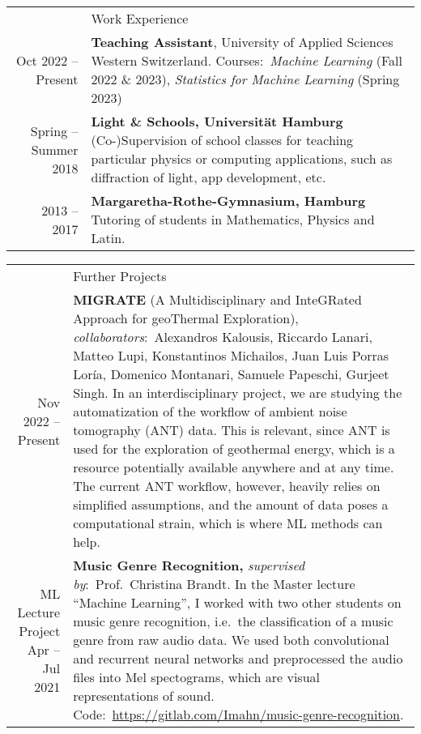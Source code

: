 \documentclass[11pt, a4paper]{article}
\newcommand{\headingfont}{\Large\color{OliveGreen}}
\newenvironment{SectionTable}[1]{
	\renewcommand*{\arraystretch}{1.7}
	\setlength{\tabcolsep}{10pt}
	\begin{longtable}{Rp{5.2in}} & #1 \\}
	{\end{longtable}\vspace{-.3cm}}
\begin{document}
	\newpage 

	\begin{SectionTable}{\headingfont Work Experience}
		Oct 2022 -- Present & \textbf{Teaching Assistant}, University of Applied Sciences Western Switzerland. \newline Courses:~\textit{Machine Learning} (Fall 2022 \& 2023), \textit{Statistics for Machine Learning} (Spring 2023) \\
		
		Spring -- Summer 2018 & 
		\textbf{Light \& Schools, Universität Hamburg} \newline
		(Co-)Supervision of school classes for teaching particular physics or computing applications, such as diffraction of light, app development, etc.\\ 
		
		2013 -- 2017 & \textbf{Margaretha-Rothe-Gymnasium, Hamburg} \newline 
		Tutoring of students in Mathematics, Physics and Latin. 
	\end{SectionTable}

	\begin{SectionTable}{\headingfont Further Projects}
		Nov 2022 -- Present & \textbf{MIGRATE} (A Multidisciplinary and InteGRated Approach for geoThermal Exploration), \textit{collaborators}:~Alexandros Kalousis, Riccardo Lanari, Matteo Lupi, Konstantinos Michailos,
        Juan Luis Porras Loría, Domenico Montanari, Samuele Papeschi, Gurjeet Singh. In an interdisciplinary project, we are studying the automatization of the workflow of ambient noise tomography (ANT) data. 
        This is relevant, since ANT is used for the exploration of geothermal energy, which is a resource potentially available anywhere and at any time. The current ANT workflow, however, heavily relies on 
        simplified assumptions, and the amount of data poses a computational strain, which is where ML methods can help.\\
        
        ML Lecture Project Apr -- Jul 2021 & \textbf{Music Genre Recognition,} \textit{supervised by}:~Prof.~Christina Brandt. In the Master lecture \enquote{Machine Learning}, I worked with two other 
        students on music genre recognition, i.e.~the classification of a music genre from raw audio data. We used both convolutional and recurrent neural networks and preprocessed the audio files into 
        Mel spectograms, which are visual representations of sound. Code:~\url{https://gitlab.com/Imahn/music-genre-recognition}.
		
	\end{SectionTable}
    
\end{document}

